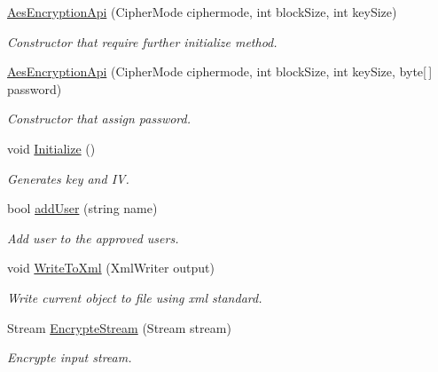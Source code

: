 \begin{DoxyCompactItemize}
\item 
\mbox{\hyperlink{class_b_s_k___encryption_1_1_encryption_1_1_aes_encryption_api_aaeca30b167bea6e2771614e810734002}{Aes\+Encryption\+Api}} (Cipher\+Mode ciphermode, int block\+Size, int key\+Size)
\begin{DoxyCompactList}\small\item\em Constructor that require further initialize method. \end{DoxyCompactList}\item 
\mbox{\hyperlink{class_b_s_k___encryption_1_1_encryption_1_1_aes_encryption_api_a4529e2907b5939d06c0deae23574c909}{Aes\+Encryption\+Api}} (Cipher\+Mode ciphermode, int block\+Size, int key\+Size, byte\mbox{[}$\,$\mbox{]} password)
\begin{DoxyCompactList}\small\item\em Constructor that assign password. \end{DoxyCompactList}\item 
void \mbox{\hyperlink{class_b_s_k___encryption_1_1_encryption_1_1_aes_encryption_api_a89804f5db642dc4abe751635f1af8df7}{Initialize}} ()
\begin{DoxyCompactList}\small\item\em Generates key and IV. \end{DoxyCompactList}\item 
bool \mbox{\hyperlink{class_b_s_k___encryption_1_1_encryption_1_1_aes_encryption_api_a0a40964a924defba499ee3f8c573c87d}{add\+User}} (string name)
\begin{DoxyCompactList}\small\item\em Add user to the approved users. \end{DoxyCompactList}\item 
void \mbox{\hyperlink{class_b_s_k___encryption_1_1_encryption_1_1_aes_encryption_api_a8849055915f670369e4c835bc4b71414}{Write\+To\+Xml}} (Xml\+Writer output)
\begin{DoxyCompactList}\small\item\em Write current object to file using xml standard. \end{DoxyCompactList}\item 
Stream \mbox{\hyperlink{class_b_s_k___encryption_1_1_encryption_1_1_aes_encryption_api_a7a5c47487ff178032ca8c9e4792d0fd5}{Encrypte\+Stream}} (Stream stream)
\begin{DoxyCompactList}\small\item\em Encrypte input stream. \end{DoxyCompactList}\item 

\end{DoxyCompactItemize}
